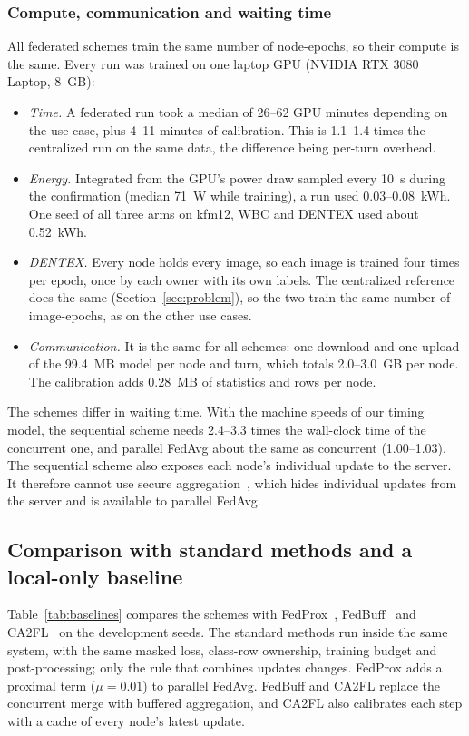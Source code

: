 \documentclass[pdflatex,sn-mathphys-num]{sn-jnl}
\begin{document}
\subsubsection{Compute, communication and waiting time}
All federated schemes train the same number of node-epochs, so their compute is the same. Every run was trained on one laptop GPU (NVIDIA RTX 3080 Laptop, 8~GB):
\begin{itemize}
\item \emph{Time.} A federated run took a median of 26--62 GPU minutes depending on the use case, plus 4--11 minutes of calibration. This is 1.1--1.4 times the centralized run on the same data, the difference being per-turn overhead.
\item \emph{Energy.} Integrated from the GPU's power draw sampled every 10~s during the confirmation (median 71~W while training), a run used 0.03--0.08~kWh. One seed of all three arms on kfm12, WBC and DENTEX used about 0.52~kWh.
\item \emph{DENTEX.} Every node holds every image, so each image is trained four times per epoch, once by each owner with its own labels. The centralized reference does the same (Section~\ref{sec:problem}), so the two train the same number of image-epochs, as on the other use cases.
\item \emph{Communication.} It is the same for all schemes: one download and one upload of the 99.4~MB model per node and turn, which totals 2.0--3.0~GB per node. The calibration adds 0.28~MB of statistics and rows per node.
\end{itemize}
The schemes differ in waiting time. With the machine speeds of our timing model, the sequential scheme needs 2.4--3.3 times the wall-clock time of the concurrent one, and parallel FedAvg about the same as concurrent (1.00--1.03). The sequential scheme also exposes each node's individual update to the server. It therefore cannot use secure aggregation~\cite{bonawitz2017secagg}, which hides individual updates from the server and is available to parallel FedAvg.

\subsection{Comparison with standard methods and a local-only baseline}\label{sec:res-baselines}
Table~\ref{tab:baselines} compares the schemes with FedProx~\cite{li2020fedprox}, FedBuff~\cite{nguyen2022fedbuff} and CA2FL~\cite{wang2024ca2fl} on the development seeds. The standard methods run inside the same system, with the same masked loss, class-row ownership, training budget and post-processing; only the rule that combines updates changes. FedProx adds a proximal term ($\mu=0.01$) to parallel FedAvg. FedBuff and CA2FL replace the concurrent merge with buffered aggregation, and CA2FL also calibrates each step with a cache of every node's latest update.
\end{document}
